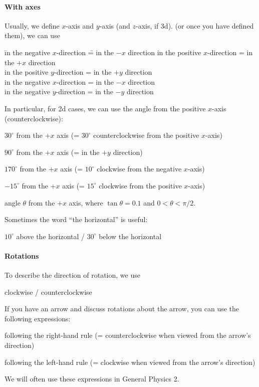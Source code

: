 \documentclass[11pt,pdfa,lastpage]{MishoNote}
\newcommand\fakebullet{\makebox[2.5em][r]{\textbullet\kern.5em}}
\begin{document}
\paragraph{With axes}
Usually, we define $x$-axis and $y$-axis (and $z$-axis, if 3d).  (or once you have defined them), we can use
\begin{tabbing}
  \fakebullet \= in the negative $x$-direction \= = in the $-x$ direction\kill
  \fakebullet \> in the positive $x$-direction \> = in the $+x$ direction\\[\itemsep]
  \fakebullet \> in the positive $y$-direction \> = in the $+y$ direction\\[\itemsep]
  \fakebullet \> in the negative $x$-direction \> = in the $-x$ direction\\[\itemsep]
  \fakebullet \> in the negative $y$-direction \> = in the $-y$ direction
 \end{tabbing}
In particular, for 2d cases, we can use the angle from the positive $x$-axis (counterclockwise):
 \begin{miniitemize}
  \item $30^\circ$ from the $+x$ axis (= $30^\circ$ counterclockwise from the positive $x$-axis)
  \item $90^\circ$ from the $+x$ axis (= in the $+y$ direction)
  \item $170^\circ$ from the $+x$ axis (= $10^\circ$ clockwise from the negative $x$-axis)
  \item $-15^\circ$ from the $+x$ axis (= $15^\circ$ clockwise from the positive $x$-axis)
  \item angle $\theta$ from the $+x$ axis, where $\tan\theta=0.1$ and $0<\theta<\pi/2$.
 \end{miniitemize}
Sometimes the word ``the horizontal'' is useful:
\begin{miniitemize}
  \item $10^\circ$ above the horizontal / $30^\circ$ below the horizontal
\end{miniitemize}

\paragraph{Rotations}
To describe the direction of rotation, we use
\begin{miniitemize}
  \item clockwise / counterclockwise
\end{miniitemize}
If you have an arrow and discuss rotations about the arrow, you can use the following expressions:
\begin{miniitemize}
  \item following the right-hand rule (= counterclockwise when viewed from the arrow's direction)
  \item following the left-hand rule (= clockwise when viewed from the arrow's direction)
\end{miniitemize}
We will often use these expressions in General Physics 2.
\end{document}
